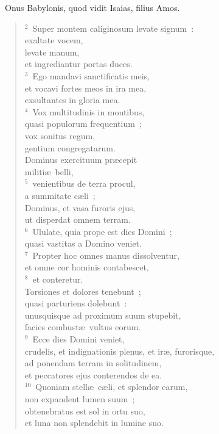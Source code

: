 ~\lettrine[lines=10,image=true,loversize=0.05,lraise=-0.03]{O}{}nus Babylonis, quod vidit Isaias, filius Amos.
\begin{flushleft}\begin{verse}\vspace{6pt}${}^{2}$~Super montem caliginosum levate signum~:\\ exaltate vocem,\\ levate manum,\\ et ingrediantur portas duces.\\
${}^{3}$~Ego mandavi sanctificatis meis,\\ et vocavi fortes meos in ira mea,\\ exsultantes in gloria mea.\\
${}^{4}$~Vox multitudinis in montibus,\\ quasi populorum frequentium~;\\ vox sonitus regum,\\ gentium congregatarum.\\ Dominus exercituum pr\ae cepit\\ militi\ae\ belli,\\
${}^{5}$~venientibus de terra procul,\\ a summitate c\ae li~;\\ Dominus, et vasa furoris ejus,\\ ut disperdat omnem terram.\\
${}^{6}$~Ululate, quia prope est dies Domini~;\\ quasi vastitas a Domino veniet.\\
${}^{7}$~Propter hoc omnes manus dissolventur,\\ et omne cor hominis contabescet,\\
${}^{8}$~et conteretur.\\ Torsiones et dolores tenebunt~;\\ quasi parturiens dolebunt~:\\ unusquisque ad proximum suum stupebit,\\ facies combust\ae\ vultus eorum.\\
${}^{9}$~Ecce dies Domini veniet,\\ crudelis, et indignationis plenus, et ir\ae , furorisque,\\ ad ponendam terram in solitudinem,\\ et peccatores ejus conterendos de ea.\\
${}^{10}$~Quoniam stell\ae\ c\ae li, et splendor earum,\\ non expandent lumen suum~;\\ obtenebratus est sol in ortu suo,\\ et luna non splendebit in lumine suo.\\

\end{verse}
\end{flushleft}

